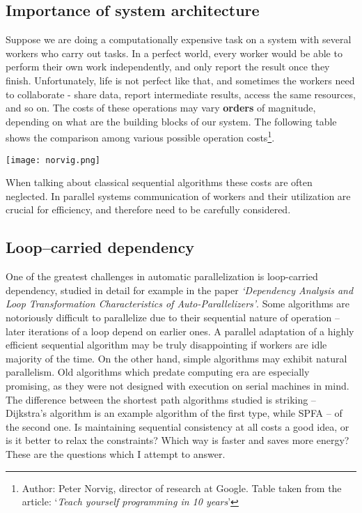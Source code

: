 \documentclass[12pt,a4paper,twoside,openright]{report}
\begin{document}
\subsection{Importance of system architecture} 
Suppose we are doing a computationally expensive task on a system with several workers who carry out tasks. In a perfect world, every worker would be able to perform their own work independently, and only report the result once they finish. Unfortunately, life is not perfect like that, and sometimes the workers need to collaborate - share data, report intermediate results, access the same resources, and so on. The costs of these operations may vary \textbf{orders} of magnitude, depending on what are the building blocks of our system. The following table shows the comparison among various possible operation costs\footnote{Author: Peter Norvig, director of research at Google. Table taken from the article: `\textit{Teach yourself programming in 10 years}'}.
\begin{center}
\texttt{[image: norvig.png]}
\end{center}

When talking about classical sequential algorithms these costs are often neglected. In parallel systems communication of workers and their utilization are crucial for efficiency, and therefore need to be carefully considered.

\subsection{Loop--carried dependency}
One of the greatest challenges in automatic parallelization is loop-carried dependency, studied in detail for example in the paper \textit{`Dependency Analysis and Loop Transformation Characteristics of Auto-Parallelizers'}\cite{loop-carried}. Some algorithms are notoriously difficult to parallelize due to their sequential nature of operation -- later iterations of a loop depend on earlier ones. A parallel adaptation of a highly efficient sequential algorithm may be truly disappointing if workers are idle majority of the time. On the other hand, simple algorithms may exhibit natural parallelism. Old algorithms which predate computing era are especially promising, as they were not designed with execution on serial machines in mind. The difference between the shortest path algorithms studied is striking -- Dijkstra's algorithm is an example algorithm of the first type, while SPFA -- of the second one. Is maintaining sequential consistency at all costs a good idea, or is it better to relax the constraints? Which way is faster and saves more energy? These are the questions which I attempt to answer.
\end{document}
